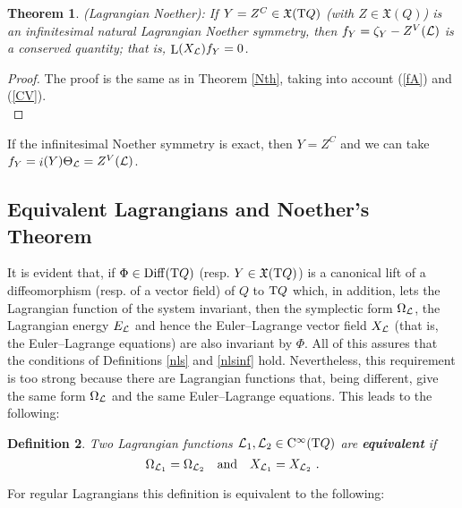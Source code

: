 \documentclass[12pt]{report}
\newtheorem{teor}{Theorem}[chapter]
\newtheorem{definition}[teor]{Definition}
\def\qed{\ifvmode\removelastskip\fi
{\unskip\nobreak\hfil\penalty50\hbox{}\nobreak\hfil
\hbox{\vrule height1.2ex width1.2ex}\parfillskip=0pt
\finalhyphendemerits=0 \par\smallskip}}
\def\vf{\mathfrak X}
\def\Lag{{\cal L}}
\def\Tan{{\rm T}}
\def\Lie{\mathop{\rm L}\nolimits}
\def\inn{\mathop{i}\nolimits}
\def\Cinfty{{\rm C}^\infty}
\begin{document}
\begin{teor}
 {\rm (Lagrangian Noether):}
If $Y=Z^C\in\vf (\Tan Q)$ (with $Z\in\vf(Q)$)
is an infinitesimal natural Lagrangian Noether symmetry,
then $f_Y=\zeta_Y-Z^V(\Lag)$
is a conserved quantity; that is, $\Lie (X_\Lag)f_Y=0$.
 \label{NthL}
\end{teor}
\begin{proof}
The proof is the same as in Theorem \ref{Nth}, taking into account (\ref{fA}) and (\ref{CV}).
\\ \qed \end{proof}

If the infinitesimal  Noether symmetry is exact, then $Y=Z^C$ and
we can take $f_Y=\inn(Y)\Theta_\Lag=Z^V(\Lag)$.


\subsection{Equivalent Lagrangians and Noether's Theorem}
\protect\label{flsltn}


It is evident that, if $\Phi\in{\rm Diff}(\Tan Q)$ (resp. $Y\in\vf (\Tan Q)$)
is a canonical lift of a diffeomorphism (resp. of a
vector field) of $Q$ to $\Tan Q$ which, in addition,
lets the Lagrangian function of the system invariant,
then the symplectic form $\Omega_{\Lag}$, the
Lagrangian energy $E_{\Lag}$ and hence the Euler--Lagrange vector field
$X_\Lag$ (that is,  the Euler--Lagrange equations) are also invariant by $\Phi$.
All of this assures that the conditions of Definitions \ref{nls} and \ref{nlsinf} hold.
Nevertheless, this requirement is too strong
because there are Lagrangian functions that, being different,
give the same form $\Omega_{\Lag}$ and the same
Euler--Lagrange equations. This leads to the following:

\begin{definition}
Two Lagrangian functions $\Lag_1,\Lag_2\in\Cinfty (\Tan Q)$
are \textbf{equivalent} if
$$
\Omega_{\Lag_1}=\Omega_{\Lag_2}
\quad {\rm and} \quad
 X_{\Lag_1}= X_{\Lag_2} \ .
$$
\end{definition}
For regular Lagrangians this definition is equivalent to the following:
\end{document}
